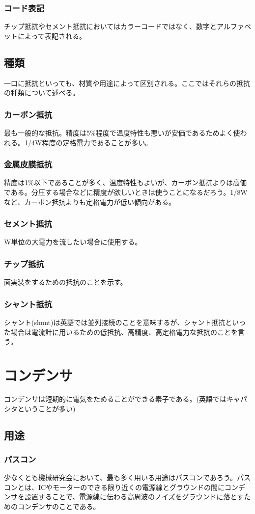 \documentclass[a4paper,titlepage]{ujarticle}
\begin{document}
\subsubsection{コード表記}
チップ抵抗やセメント抵抗においてはカラーコードではなく、数字とアルファベットによって表記される。
\subsection{種類}
一口に抵抗といっても、材質や用途によって区別される。ここではそれらの抵抗の種類について述べる。
\subsubsection{カーボン抵抗}
最も一般的な抵抗。精度は5\%程度で温度特性も悪いが安価であるためよく使われる。1/4W程度の定格電力であることが多い。
\subsubsection{金属皮膜抵抗}
精度は1\%以下であることが多く、温度特性もよいが、カーボン抵抗よりは高価である。分圧する場合などに精度が欲しいときは使うことになるだろう。1/8Wなど、カーボン抵抗よりも定格電力が低い傾向がある。
\subsubsection{セメント抵抗}
W単位の大電力を流したい場合に使用する。
\subsubsection{チップ抵抗}
面実装をするための抵抗のことを示す。
\subsubsection{シャント抵抗}
シャント(shunt)は英語では並列接続のことを意味するが、シャント抵抗といった場合は電流計に用いるための低抵抗、高精度、高定格電力な抵抗のことを言う。
\section{コンデンサ}
コンデンサは短期的に電気をためることができる素子である。(英語ではキャパシタということが多い)
\subsection{用途}
\subsubsection{パスコン}
少なくとも機械研究会において、最も多く用いる用途はパスコンであろう。パスコンとは、ICやモーターのできる限り近くの電源線とグラウンドの間にコンデンサを設置することで、電源線に伝わる高周波のノイズをグラウンドに落とすためのコンデンサのことである。
\end{document}
